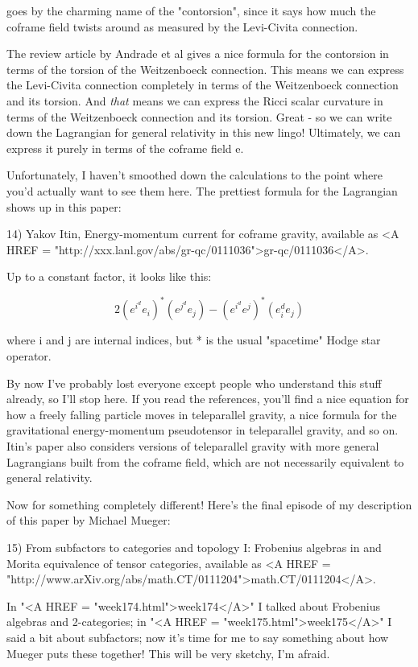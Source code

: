 goes by the charming name of the "contorsion", since it says how
much the coframe field twists around as measured by the Levi-Civita
connection.

The review article by Andrade et al gives a nice formula for the
contorsion in terms of the torsion of the Weitzenboeck connection.  
This means we can express the Levi-Civita connection completely in 
terms of the Weitzenboeck connection and its torsion.  And \emph{that}
means we can express the Ricci scalar curvature in terms of the 
Weitzenboeck connection and its torsion.  Great - so we can write 
down the Lagrangian for general relativity in this new lingo!  
Ultimately, we can express it purely in terms of the coframe field e.  

Unfortunately, I haven't smoothed down the calculations to the point
where you'd actually want to see them here.  The prettiest formula 
for the Lagrangian shows up in this paper:

14) Yakov Itin, Energy-momentum current for coframe gravity, available
as <A HREF = "http://xxx.lanl.gov/abs/gr-qc/0111036">gr-qc/0111036</A>.

Up to a constant factor, it looks like this:

$$
2(e^{i} ^ de_{i}) ^ *(e^{j} ^ de_{j}) - (e^{i} ^ de^{j}) ^ *(e_{i} ^ de_{j}) 
$$
    

where i and j are internal indices, but * is the usual "spacetime" Hodge
star operator.

By now I've probably lost everyone except people who understand this
stuff already, so I'll stop here.  If you read the references, you'll
find a nice equation for how a freely falling particle moves in 
teleparallel gravity, a nice formula for the gravitational
energy-momentum pseudotensor in teleparallel gravity, and so on.  
Itin's paper also considers versions of teleparallel gravity with
more general Lagrangians built from the coframe field, which are not
necessarily equivalent to general relativity.

Now for something completely different!  Here's the final episode of my
description of this paper by Michael Mueger:

15) From subfactors to categories and topology I: Frobenius algebras in
and Morita equivalence of tensor categories, available as
<A HREF = "http://www.arXiv.org/abs/math.CT/0111204">math.CT/0111204</A>.

In "<A HREF = "week174.html">week174</A>" I talked about Frobenius algebras and 2-categories;
in "<A HREF = "week175.html">week175</A>" I said a bit about subfactors; now it's time for me to
say something about how Mueger puts these together!   This will be 
very sketchy, I'm afraid.  


